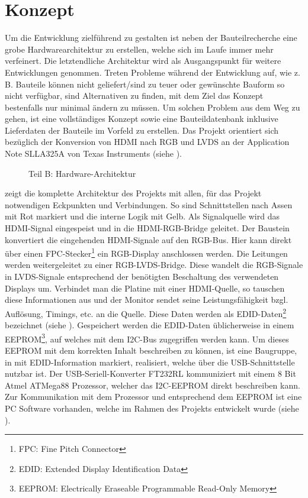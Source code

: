 \section{Konzept}
\label{sec:TeilB_Konzept}
Um die Entwicklung zielführend zu gestalten ist neben der Bauteilrecherche eine grobe Hardwarearchitektur zu erstellen, welche sich im Laufe immer mehr verfeinert. Die letztendliche Architektur wird als Ausgangspunkt für weitere Entwicklungen genommen. Treten Probleme während der Entwicklung auf, wie z. B. Bauteile können nicht geliefert/sind zu teuer oder gewünschte Bauform so nicht verfügbar, sind Alternativen zu finden, mit dem Ziel das Konzept bestenfalls nur minimal ändern zu müssen. Um solchen Problem aus dem Weg zu gehen, ist eine vollständiges Konzept sowie eine Bauteildatenbank inklusive Lieferdaten der Bauteile im Vorfeld zu erstellen. Das Projekt orientiert sich bezüglich der Konversion von HDMI nach RGB und LVDS an der Application Note SLLA325A von Texas Instruments (siehe \cite{TI2011}).
\begin{figure}[htp]
	\centering
{}
	\caption{Teil B: Hardware-Architektur}
	\label{fig:teilb_architektur}
\end{figure}

 zeigt die komplette Architektur des Projekts mit allen, für das Projekt notwendigen Eckpunkten und Verbindungen. So sind Schnittstellen nach Assen mit Rot markiert und die interne Logik mit Gelb. Als Signalquelle wird das HDMI-Signal eingespeist und in die HDMI-RGB-Bridge geleitet. Der Baustein  konvertiert die eingehenden HDMI-Signale auf den RGB-Bus. Hier kann direkt über einen FPC-Stecker\footnote{FPC: Fine Pitch Connector} ein RGB-Display anschlossen werden. Die Leitungen werden weitergeleitet zu einer RGB-LVDS-Bridge. Diese wandelt die RGB-Signale in LVDS-Signale entsprechend der benötigten Beschaltung des verwendeten Displays um. Verbindet man die Platine mit einer HDMI-Quelle, so tauschen diese Informationen aus und der Monitor sendet seine Leistungsfähigkeit bzgl. Auflösung, Timings, etc. an die Quelle. Diese Daten werden als EDID-Daten\footnote{EDID: Extended Display Identification Data} bezeichnet (siehe ). Gespeichert werden die EDID-Daten üblicherweise in einem EEPROM\footnote{EEPROM: Electrically Eraseable Programmable Read-Only Memory}, auf welches mit dem I2C-Bus zugegriffen werden kann. Um dieses EEPROM mit dem korrekten Inhalt beschreiben zu können, ist eine Baugruppe, in  mit EDID-Information markiert, realisiert, welche über die USB-Schnittstelle nutzbar ist. Der USB-Seriell-Konverter FT232RL kommuniziert mit einem 8 Bit Atmel ATMega88 Prozessor, welcher das I2C-EEPROM direkt beschreiben kann. Zur Kommunikation mit dem Prozessor und entsprechend dem EEPROM ist eine PC Software vorhanden, welche im Rahmen des Projekts entwickelt wurde (siehe ). \newpage